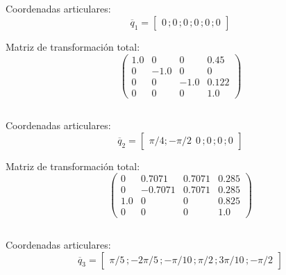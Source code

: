 \documentclass[a4paper,12pt]{article}
\begin{document}
\subsection{}
Coordenadas articulares:
\begin{equation*}
    \overline{q}_1 = 
    \begin{bmatrix}
        0\,;0\,;0\,;0\,;0\,;0
    \end{bmatrix}
\end{equation*}

Matriz de transformación total:
\begin{equation}
    \left(\begin{array}{cccc} 1.0 & 0 & 0 & 0.45\\ 0 & -1.0 & 0 & 0\\ 0 & 0 & -1.0 & 0.122\\ 0 & 0 & 0 & 1.0 \end{array}\right)
    \label{T_q1}
\end{equation}

\subsection{}
Coordenadas articulares:
\begin{equation*}
    \overline{q}_2 = 
    \begin{bmatrix}
        \pi/4;-\pi/2\,\;0\,;0\,;0\,;0
    \end{bmatrix}
\end{equation*}

Matriz de transformación total:
\begin{equation}
    \left(\begin{array}{cccc} 0 & 0.7071 & 0.7071 & 0.285\\ 0 & -0.7071 & 0.7071 & 0.285\\ 1.0 & 0 & 0 & 0.825\\ 0 & 0 & 0 & 1.0 \end{array}\right)
    \label{T_q2}
\end{equation}

\subsection{}
Coordenadas articulares:
\begin{equation*}
    \overline{q}_3 = 
    \begin{bmatrix}
        \pi/5\,;-2\pi/5\,;-\pi/10\,;\pi/2\,;3\pi/10\,;-\pi/2
    \end{bmatrix}
\end{equation*}
\end{document}
